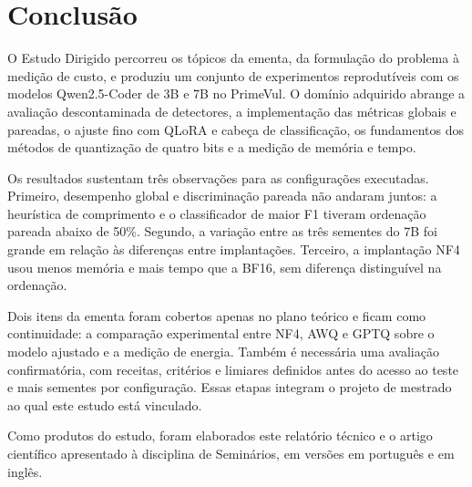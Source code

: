 \chapter{Conclusão}

O Estudo Dirigido percorreu os tópicos da ementa, da formulação do problema à medição de custo, e produziu um conjunto de experimentos reprodutíveis com os modelos Qwen2.5-Coder de 3B e 7B no PrimeVul. O domínio adquirido abrange a avaliação descontaminada de detectores, a implementação das métricas globais e pareadas, o ajuste fino com QLoRA e cabeça de classificação, os fundamentos dos métodos de quantização de quatro bits e a medição de memória e tempo.

Os resultados sustentam três observações para as configurações executadas. Primeiro, desempenho global e discriminação pareada não andaram juntos: a heurística de comprimento e o classificador de maior F1 tiveram ordenação pareada abaixo de 50\%. Segundo, a variação entre as três sementes do 7B foi grande em relação às diferenças entre implantações. Terceiro, a implantação NF4 usou menos memória e mais tempo que a BF16, sem diferença distinguível na ordenação.

Dois itens da ementa foram cobertos apenas no plano teórico e ficam como continuidade: a comparação experimental entre NF4, AWQ e GPTQ sobre o modelo ajustado e a medição de energia. Também é necessária uma avaliação confirmatória, com receitas, critérios e limiares definidos antes do acesso ao teste e mais sementes por configuração. Essas etapas integram o projeto de mestrado ao qual este estudo está vinculado.

Como produtos do estudo, foram elaborados este relatório técnico e o artigo científico apresentado à disciplina de Seminários, em versões em português e em inglês.
